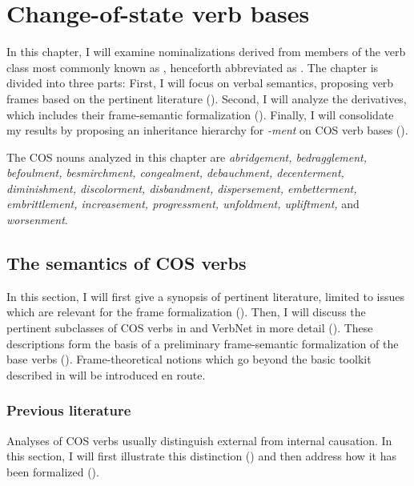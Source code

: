 \chapter{Change-of-state verb bases}\label{ch:cos}

In this chapter, I will examine nominalizations derived from members of the verb class most commonly known as , henceforth abbreviated as . 
The chapter is divided into three parts: First, I will focus on verbal semantics, proposing verb frames based on the pertinent literature (). 
Second, I will analyze the \ment{} derivatives, which includes their frame-semantic formalization (). 
Finally, I will consolidate my results by proposing an inheritance hierarchy for \textit{-ment} on COS verb bases ().

The COS nouns analyzed in this chapter are \textit{abridgement, bedragglement, befoulment, besmirchment, congealment, debauchment, decenterment, diminishment, discolorment, disbandment, dispersement, embetterment, embrittlement, increasement, progressment, unfoldment, upliftment,} and \textit{worsenment}.  

\section{The semantics of COS verbs}
\label{sec:cos-input}

In this section, I will first give a synopsis of pertinent literature, limited to issues which are relevant for the frame formalization (). 
Then, I will discuss the pertinent subclasses of COS verbs in \citet{Levin.1993} and VerbNet in more detail (). 
These descriptions form the basis of a preliminary frame-semantic formalization of the base verbs (). Frame-theoretical notions which go beyond the basic toolkit described in  will be introduced en route.   

\subsection{Previous literature} 
\label{sec:cos-prev}

Analyses of COS verbs usually distinguish external from internal causation. In this section, I will first illustrate this distinction () and then address how it has been formalized ().

